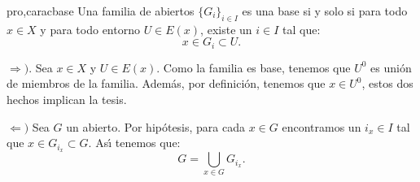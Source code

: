 \begin{proposicion}{pro,caracbase} Una familia de abiertos $\{G_i\}_{i\in I}$ es
una base si y solo si para todo $x\in X$ y para todo entorno $U\in
E(x)$, existe un $i\in I$ tal que:
\[
    x\in G_i\subset U.
\]
\end{proposicion}
\begin{demo} $\Rightarrow )$. Sea $x\in X$ y $U\in E(x)$. Como la familia es
base, tenemos que $U^0$ es unión de miembros de la familia.
Además, por definición, tenemos que $x\in U^0$, estos dos
hechos implican la tesis.

$\Leftarrow)$ Sea $G$ un abierto. Por hipótesis, para cada $x\in
G$ encontramos un $i_x\in I$ tal que $x\in G_{i_x}\subset G$.
As\'{\i} tenemos que:
\[
    G=\bigcup\limits_{x\in G}G_{i_x}.
\]
\end{demo}

